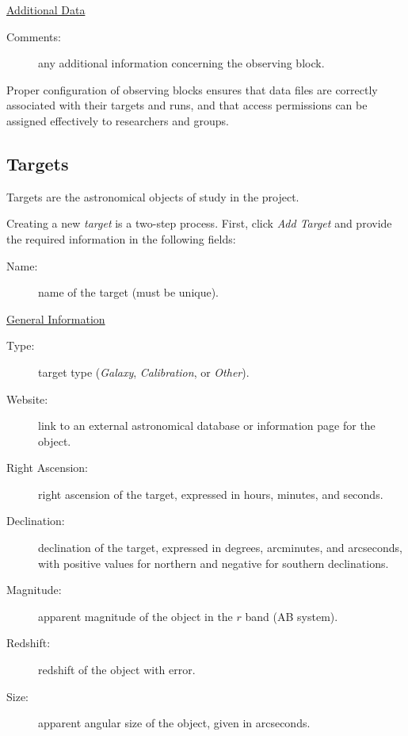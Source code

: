 
\underline{Additional Data}

\begin{description}
	\item[Comments:] any additional information concerning the observing block.
\end{description}


Proper configuration of observing blocks ensures that data files are correctly associated with their targets and runs, and that access permissions can be assigned effectively to researchers and groups.

\subsection{Targets}

Targets are the astronomical objects of study in the project. 

Creating a new \textsl{target} is a two-step process. First, click \textsl{Add Target} and provide the required information in the following fields:

\begin{description}
	\item[Name:] name of the target (must be unique).
\end{description}


\underline{General Information}

\begin{description}
	\item[Type:]target type (\textsl{Galaxy}, \textsl{Calibration}, or \textsl{Other}).
	\item[Website:] link to an external astronomical database or information page for the object.
	\item[Right Ascension:] right ascension of the target, expressed in hours, minutes, and seconds.
	\item[Declination:] declination of the target, expressed in degrees, arcminutes, and arcseconds, with positive values for northern and negative for southern declinations.
	\item[Magnitude:] apparent magnitude of the object in the $r$ band (AB system). 
	\item[Redshift:] redshift of the object with error.
	\item[Size:] apparent angular size of the object, given in arcseconds.
\end{description}

